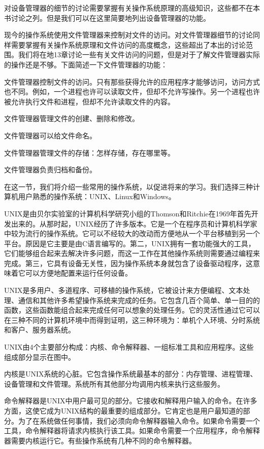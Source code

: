 对设备管理器的细节的讨论需要掌握有关操作系统原理的高级知识，这些都不在本书讨论之列。但是我们可以在这里简要地列出设备管理器的功能。

现今的操作系统使用文件管理器来控制对文件的访问。对文件管理器细节的讨论同样需要掌握有关操作系统原理和文件访问的高度概念，这些超出了本出的讨论范围。我们将在地13章讨论一些有关文件访问的问题，但是对于了解文件管理器实际的操作还是不够。下面简述一下文件管理器的功能：

文件管理器控制文件的访问。只有那些获得允许的应用程序才能够访问，访问方式也不同。例如，一个进程也许可以读取文件，但却不允许写操作。另一个进程也许被允许执行文件和进程，但却不允许读取文件的内容。

文件管理器管理文件的创建、删除和修改。

文件管理器可以给文件命名。

文件管理器管理文件的存储：怎样存储，存在哪里等。

文件管理器负责归档和备份。

在这一节，我们将介绍一些常用的操作系统，以促进将来的学习。我们选择三种计算机用户熟悉的操作系统：UNIX、Linux和Windows。

UNIX是由贝尔实验室的计算机科学研究小组的Thomson和Ritchie在1969年首先开发出来的。从那时起，UNIX经历了许多版本。它是一个在程序员和计算机科学家中较为流行的操作系统。它可以不经较大的改动而方便地从一个平台移植到另一个平台。原因是它主要是由C语言编写的。第二，UNIX拥有一套功能强大的工具，它们能够组合起来去解决许多问题，而这一工作在其他操作系统则需要通过编程来完成。第三，它具有设备无关性，因为操作系统本身就包含了设备驱动程序，这意味着它可以方便地配置来运行任何设备。

UNIX是多用户、多道程序、可移植的操作系统，它被设计来方便编程、文本处理、通信和其他许多希望操作系统来完成的任务。它包含几百个简单、单一目的的函数，这些函数能组合起来完成任何可以想象的处理任务。它的灵活性通过它可以在三种不同的计算机环境中而得到证明，这三种环境为：单机个人环境、分时系统和客户、服务器系统。

UNIX由4个主要部分构成：内核、命令解释器、一组标准工具和应用程序。这些组成部分显示在图中。

内核是UNIX系统的心脏。它包含操作系统最基本的部分：内存管理、进程管理、设备管理和文件管理。系统所有其他部分均调用内核来执行这些服务。

命令解释器是UNIX中用户最可见的部分。它接收和解释用户输入的命令。在许多方面，这使它成为UNIX结构的最重要的组成部分。它肯定也是用户最知道的部分。为了在系统做任何事情，我们必须向命令解释器输入命令。如果命令需要一个工具，命令解释器将请求内核执行该工具。如果命令需要一个应用程序，命令解释器需要内核运行它。有些操作系统有几种不同的命令解释器。

